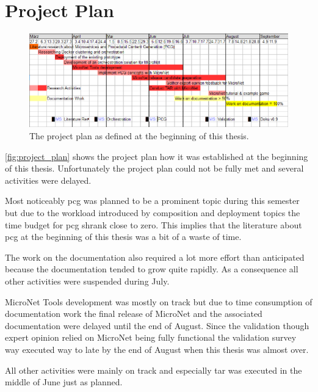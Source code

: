 \chapter{Project Plan}

\begin{figure}[H]
	\hspace*{-1.6cm}
  	\centering
  	\includegraphics[width=1.2\textwidth]{images/ProjectPlan}
  	\caption{The project plan as defined at the beginning of this thesis.}
  	\label{fig:project_plan}
\end{figure}


\autoref{fig:project_plan} shows the project plan how it was established at the
beginning of this thesis. Unfortunately the project plan could not be fully met
and several activities were delayed.

Most noticeably \gls{pcg} was planned to be a prominent topic during this semester but
due to the workload introduced by composition and deployment topics the time
budget for \gls{pcg} shrank close to zero. This implies that the literature
about \gls{pcg} at the beginning of this thesis was a bit of a waste of time.

The work on the documentation also required a lot more effort than anticipated
because the documentation tended to grow quite rapidly. As a consequence all
other activities were suspended during July.

MicroNet Tools development was mostly on track but due to time consumption of
documentation work the final release of MicroNet and the associated
documentation were delayed until the end of August. Since the validation though
expert opinion relied on MicroNet being fully functional the validation survey
way executed way to late by the end of August when this thesis was almost over. 

All other activities were mainly on track and especially \gls{tar} was executed
in the middle of June just as planned.
